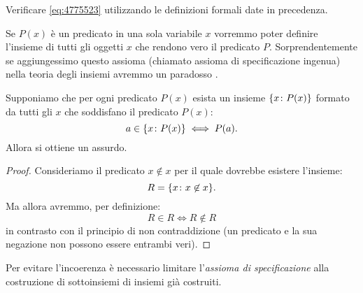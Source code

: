 \begin{exercise}
  Verificare \eqref{eq:4775523} utilizzando le definizioni formali date in precedenza.
\end{exercise}
\begin{comment}
\begin{proof}[Svolgimento.]
Utilizzando le definizioni di unione, di singoletto e di disgiunzione logica
si ha l'equivalenza dei seguenti
predicati:
\begin{gather*}
  x \in \ENCLOSE{a,a}  \\
  x \in \ENCLOSE{a} \cup \ENCLOSE{a}\\
  (x \in \ENCLOSE{a}) \lor (x \in \ENCLOSE{a})\\
  (x = a) \lor (x = a) \\
  x = a \\
  x \in \ENCLOSE{a}
\end{gather*}
e dunque $\ENCLOSE{a,a}=\ENCLOSE{a}$ per la definizione di uguaglianza tra insiemi.
\end{proof}
\end{comment}

Se $P(x)$ è un predicato in una sola variabile $x$ vorremmo poter
definire l'insieme di tutti gli oggetti $x$ 
che rendono vero il predicato $P$.
Sorprendentemente se aggiungessimo questo assioma 
(chiamato assioma di specificazione ingenua) nella teoria degli insiemi
avremmo un paradosso%
%
%
%
%
%
.

\begin{theorem}
\label{th:Russell}%
Supponiamo che per ogni predicato $P(x)$ esista un insieme 
${\left\{ x\colon P(x) \right\}}$ formato da tutti gli $x$ 
che soddisfano il predicato $P(x)$:
\[
  a \in {\left\{ x\colon P(x) \right\}} \iff P(a).
\]
Allora si ottiene un assurdo.
\end{theorem}
%
\begin{proof}
  Consideriamo il predicato $x \not \in x$
  per il quale dovrebbe esistere l'insieme:
  \[
    R = {\left\{ x\colon x\not \in x \right\}}.  
  \]
  Ma allora avremmo, per definizione:
  \[
    R \in R 
    \iff R\not \in R
  \]
  in contrasto con il principio di non contraddizione
  (un predicato e la sua negazione non possono essere entrambi veri).
\end{proof}

Per evitare l'incoerenza è necessario limitare l'\emph{assioma di specificazione}
alla costruzione di sottoinsiemi di insiemi già costruiti.

